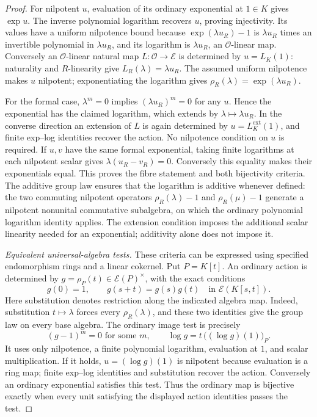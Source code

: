 \begin{proof}
For nilpotent $u$, evaluation of its ordinary exponential at
$1\in K$ gives $\exp u$. The inverse polynomial logarithm recovers $u$,
proving injectivity. Its values have a uniform nilpotence bound because
$\exp(\lambda u_R)-1$ is $\lambda u_R$ times an invertible polynomial
in $\lambda u_R$, and
its logarithm is $\lambda u_R$, an $\mathcal O$-linear map.
Conversely an $\mathcal O$-linear natural map
$L:\mathcal O\to\mathscr E$ is determined by $u=L_K(1)$: naturality and
$R$-linearity give $L_R(\lambda)=\lambda u_R$. The assumed uniform
nilpotence makes $u$ nilpotent; exponentiating the logarithm gives
$\rho_R(\lambda)=\exp(\lambda u_R)$.

For the formal case, $\lambda^m=0$ implies $(\lambda u_R)^m=0$ for any
$u$. Hence the exponential has the claimed logarithm, which extends by
$\lambda\mapsto\lambda u_R$. In the converse direction an extension of
$L$ is again determined by $u=L_K^{\mathrm{ext}}(1)$, and finite exp--log
identities recover the action. No nilpotence condition on $u$ is required.
If $u,v$ have the same formal exponential, taking finite logarithms at
each nilpotent scalar gives $\lambda(u_R-v_R)=0$. Conversely this equality
makes their exponentials equal. This proves the fibre statement and both
bijectivity criteria. The additive group law ensures that the logarithm
is additive whenever defined: the two commuting nilpotent operators
$\rho_R(\lambda)-1$ and $\rho_R(\mu)-1$ generate a nilpotent nonunital
commutative subalgebra, on which the ordinary polynomial logarithm
identity applies.
The extension condition imposes the additional scalar linearity needed
for an exponential; additivity alone does not impose it.

\emph{Equivalent universal-algebra tests.}
These criteria can be expressed using specified endomorphism rings and
a linear cokernel. Put $P=K[t]$. An ordinary action is determined by
$g=\rho_P(t)\in\mathscr E(P)^\times$, with the exact conditions
\[
 g(0)=1,\qquad g(s+t)=g(s)g(t)
                  \quad\text{in }\mathscr E(K[s,t]).
\]
Here substitution denotes restriction along the indicated algebra map.
Indeed, substitution $t\mapsto\lambda$ forces every
$\rho_R(\lambda)$, and these two identities give the group law on every
base algebra. The ordinary image test is precisely
\[
 (g-1)^m=0\text{ for some }m,\qquad
 \log g=t\,\bigl((\log g)(1)\bigr)_P.
\]
It uses only nilpotence, a finite polynomial logarithm, evaluation at
$1$, and scalar multiplication. If it holds,
$u=(\log g)(1)$ is nilpotent because evaluation is a ring map;
finite exp--log identities and substitution recover the action.
Conversely an ordinary exponential satisfies this test. Thus the
ordinary map is bijective exactly when every unit satisfying the
displayed action identities passes the test.


\end{proof}
